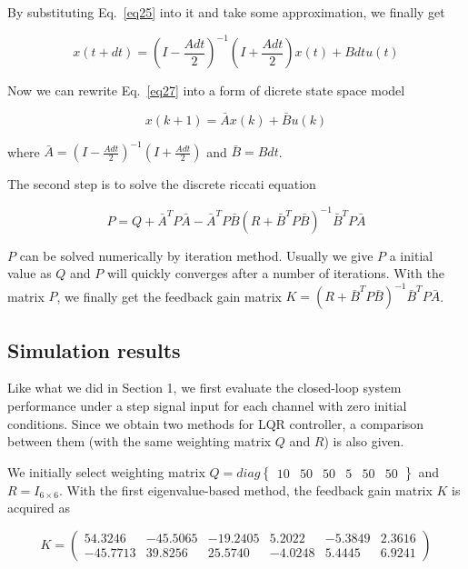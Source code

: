 \documentclass[hyperref]{article}
\theoremstyle{nonumberplain}
\begin{document}
	By substituting Eq.~\ref{eq25} into it and take some approximation, we finally get
	
	\begin{equation}
	x(t+dt)=(I-\frac{Adt}{2})^{-1}(I+\frac{Adt}{2})x(t)+Bdtu(t)
	\label{eq27}
	\end{equation}
	
	Now we can rewrite Eq.~\ref{eq27} into a form of dicrete state space model
	
	\begin{equation}
	x(k+1)=\bar{A}x(k)+\bar{B}u(k)
	\label{eq28}
	\end{equation}
	
	where $\bar{A}=(I-\frac{Adt}{2})^{-1}(I+\frac{Adt}{2})$ and $\bar{B}=Bdt$.
	
	The second step is to solve the discrete riccati equation
	
	\begin{equation}
	P=Q+\bar{A}^{T}P\bar{A}-\bar{A}^{T}P\bar{B}(R+\bar{B}^{T}P\bar{B})^{-1}\bar{B}^{T}P\bar{A}
	\label{eq29}
	\end{equation}
	
	$P$ can be solved numerically by iteration method. Usually we give $P$ a initial value as $Q$ and $P$ will quickly converges after a number of iterations. With the matrix $P$, we finally get the feedback gain matrix $K=(R+\bar{B}^{T}P\bar{B})^{-1}\bar{B}^{T}P\bar{A}$.
	
	
	\subsection{Simulation results}
	
	\hspace{1.0em}
	Like what we did in Section 1, we first evaluate the closed-loop system performance under a step signal input for each channel with zero initial conditions. Since we obtain two methods for LQR controller, a comparison between them (with the same weighting matrix $Q$ and $R$) is also given.
	
	We initially select weighting matrix $Q=diag\begin{Bmatrix}
	10 &50  &50  &5  &50  &50 
	\end{Bmatrix}$ and $R=I_{6\times 6}$. With the first eigenvalue-based method, the feedback gain matrix $K$ is acquired as
	
	\begin{equation}
	K=\begin{pmatrix}
	54.3246 &-45.5065  &-19.2405  &5.2022  &-5.3849  &2.3616 \\ 
	-45.7713 &39.8256  &25.5740  &-4.0248  &5.4445  &6.9241 
	\end{pmatrix}
	\nonumber
	\end{equation}
	
\end{document}
